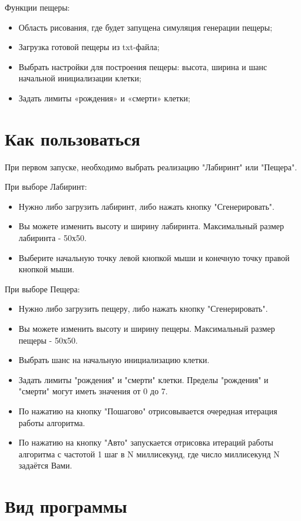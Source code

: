 \documentclass[11pt, letterpaper]{article}
\begin{document}
Функции пещеры:

\begin{itemize}
	\item Область рисования, где будет запущена симуляция генерации пещеры;
	\item Загрузка готовой пещеры из txt-файла;
	\item Выбрать настройки для построения пещеры: высота, ширина и шанс начальной инициализации клетки;
	\item Задать лимиты «рождения» и «смерти» клетки;
\end{itemize}


\section{Как пользоваться}
При первом запуске, необходимо выбрать реализацию "Лабиринт" или "Пещера".

При выборе Лабиринт:
\begin{itemize}
	\item Нужно либо загрузить лабиринт, либо нажать кнопку "Сгенерировать". 
	\item Вы можете изменить высоту и ширину лабиринта. Максимальный размер лабиринта - 50х50.
	\item Выберите начальную точку левой кнопкой мыши и конечную точку правой кнопкой мыши.
\end{itemize}


 При выборе Пещера:
 \begin{itemize}	
	\item Нужно либо загрузить пещеру, либо нажать кнопку "Сгенерировать". 
	\item Вы можете изменить высоту и ширину пещеры. Максимальный размер пещеры - 50х50.
	\item Выбрать шанс на начальную инициализацию клетки.
	\item Задать лимиты "рождения" и "смерти" клетки. Пределы "рождения" и "смерти" могут иметь значения от 0 до 7.
	\item По нажатию на кнопку "Пошагово" отрисовывается очередная итерация работы алгоритма.
	\item По нажатию на кнопку "Авто" запускается отрисовка итераций работы алгоритма с частотой 1 шаг в N миллисекунд, где число миллисекунд N задаётся Вами.
\end{itemize}


\section{Вид программы}
\end{document}
